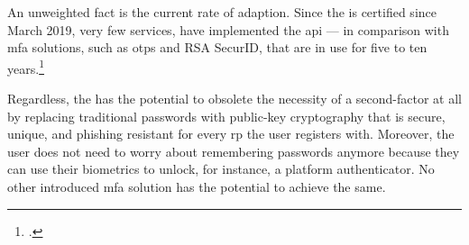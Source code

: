 An unweighted fact is the current rate of adaption. Since the \wa{} is certified since March 2019, very few services, have implemented the \gls{api} --- in comparison with \gls{mfa} solutions, such as \glspl{otp} and RSA SecurID, that are in use for five to ten years.\footcites[See][]{works-with-yubico}
 
Regardless, the \wa{} has the potential to obsolete the necessity of a second-factor at all by replacing traditional passwords with public-key cryptography that is secure, unique, and phishing resistant for every \gls{rp} the user registers with. Moreover, the user does not need to worry about remembering passwords anymore because they can use their biometrics to unlock, for instance, a platform authenticator. No other introduced \gls{mfa} solution has the potential to achieve the same.
